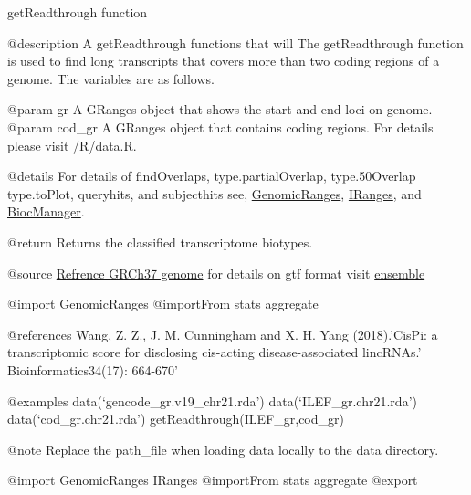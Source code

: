 \documentclass[]{article}
\begin{document}
getReadthrough function

@description A getReadthrough functions that will The getReadthrough
function is used to find long transcripts that covers more than two
coding regions of a genome. The variables are as follows.

@param gr A GRanges object that shows the start and end loci on genome.
@param cod\_gr A GRanges object that contains coding regions. For
details please visit /R/data.R.

@details For details of findOverlaps, type.partialOverlap,
type.50Overlap type.toPlot, queryhits, and subjecthits see,
\href{https://www.bioconductor.org/packages/release/bioc/html/GenomicRanges.html}{GenomicRanges},
\href{https://www.bioconductor.org/packages/release/bioc/html/IRanges.html}{IRanges},
and \href{http://bioconductor.org/install/index.html}{BiocManager}.

@return Returns the classified transcriptome biotypes.

@source
\href{https://www.gencodegenes.org/human/release_25lift37.html}{Refrence
GRCh37 genome} for details on gtf format visit
\href{https://useast.ensembl.org/info/website/upload/gff.html}{ensemble}

@import GenomicRanges @importFrom stats aggregate

@references Wang, Z. Z., J. M. Cunningham and X. H. Yang (2018).'CisPi:
a transcriptomic score for disclosing cis-acting disease-associated
lincRNAs.' Bioinformatics34(17): 664-670'

@examples data(`gencode\_gr.v19\_chr21.rda') data(`ILEF\_gr.chr21.rda')
data(`cod\_gr.chr21.rda') getReadthrough(ILEF\_gr,cod\_gr)


@note Replace the path\_file when loading data locally to the data
directory.

@import GenomicRanges IRanges @importFrom stats aggregate @export
\end{document}
